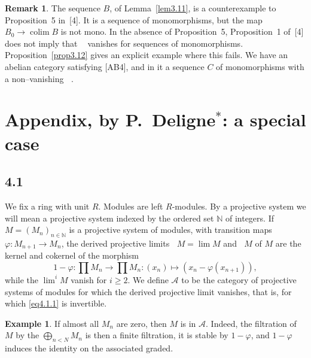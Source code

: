 \documentclass[11pt,a4paper]{article}
\theoremstyle{plain}
\theoremstyle{definition}
\newtheorem{example}[theorem]{Example}
\newtheorem{remark}[theorem]{Remark}
\DeclareMathOperator{\colim}{colim}
\DeclareMathOperator{\colimone}{\colim\nolimits^{1}}
\DeclareMathOperator{\limone}{\lim\nolimits^{1}}
\DeclareMathOperator{\limnull}{\lim\nolimits^{0}}
\numberwithin{equation}{section}
\begin{document}
\begin{remark}\label{rem3.13}
The sequence $B$, of Lemma~\ref{lem3.11}, is a counterexample to Proposition~5 in~[4]. It is a sequence of monomorphisms, but the map $B_{0} \to \colim B$ is not mono. In the absence of Proposition~5, Proposition~1 of~[4] does not imply that $\colimone$ vanishes for sequences of monomorphisms. Proposition~\ref{prop3.12} gives an explicit example where this fails. We have an abelian category satisfying [AB4], and in it a sequence $C$ of monomorphisms with a non--vanishing $\colimone$.
\end{remark}


\section{Appendix, by P.~Deligne$^{*}$: a special case}

\subsection*{4.1}

We fix a ring with unit $R$. Modules are left $R$-modules. By a projective system we will mean a projective system indexed by the ordered set $\mathbb{N}$ of integers. If $M = (M_{n})_{n\in\mathbb{N}}$ is a projective system of modules, with transition maps $\varphi: M_{n+1} \to M_{n}$, the derived projective limits $\limnull M = \lim M$ and $\limone M$ of $M$ are the kernel and cokernel of the morphism
\begin{equation}\label{eq4.1.1}
1-\varphi: \prod M_{n} \to \prod M_{n}: (x_{n}) \longmapsto (x_{n} - \varphi(x_{n+1})),
\tag{4.1.1}
\end{equation}
while the $\lim^{i} M$ vanish for $i \geq 2$. We define $\mathcal{A}$ to be the category of projective systems of modules for which the derived projective limit vanishes, that is, for which \eqref{eq4.1.1} is invertible.

\begin{example}\label{ex4.1.2}
If almost all $M_{n}$ are zero, then $M$ is in $\mathcal{A}$. Indeed, the filtration of $M$ by the $\bigoplus_{n<N} M_{n}$ is then a finite filtration, it is stable by $1-\varphi$, and $1-\varphi$ induces the identity on the associated graded.
\end{example}
\end{document}
